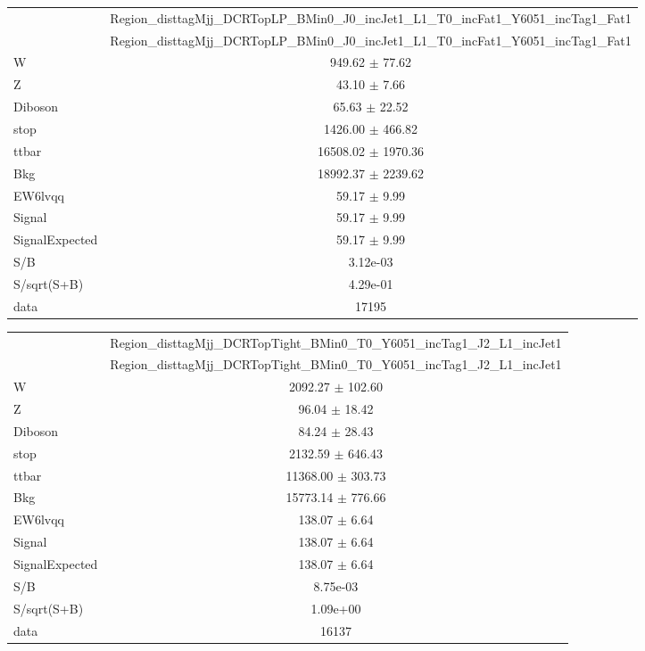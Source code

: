 \documentclass{article}
\begin{document}
\begin{table}
\centering
\small
\begin{tabular}{l|c|}
\cline{2-2}
 & \multicolumn{1}{c|}{Region\_disttagMjj\_DCRTopLP\_BMin0\_J0\_incJet1\_L1\_T0\_incFat1\_Y6051\_incTag1\_Fat1}\\
\cline{2-2}
 & \multicolumn{1}{c|}{Region\_disttagMjj\_DCRTopLP\_BMin0\_J0\_incJet1\_L1\_T0\_incFat1\_Y6051\_incTag1\_Fat1}\\ \hline
W & 949.62 $\pm$ 77.62\\
Z & 43.10 $\pm$ 7.66\\
Diboson & 65.63 $\pm$ 22.52\\
stop & 1426.00 $\pm$ 466.82\\
ttbar & 16508.02 $\pm$ 1970.36\\
\hline
Bkg & 18992.37 $\pm$ 2239.62\\
\hline
EW6lvqq & 59.17 $\pm$ 9.99\\
\hline
Signal & 59.17 $\pm$ 9.99\\
SignalExpected & 59.17 $\pm$ 9.99\\
\hline
S/B & 3.12e-03\\
S/sqrt(S+B) & 4.29e-01\\
\hline
data & 17195\\ \hline
\end{tabular}
\end{table}


\clearpage


\begin{table}
\centering
\small
\begin{tabular}{l|c|}
\cline{2-2}
 & \multicolumn{1}{c|}{Region\_disttagMjj\_DCRTopTight\_BMin0\_T0\_Y6051\_incTag1\_J2\_L1\_incJet1}\\
\cline{2-2}
 & \multicolumn{1}{c|}{Region\_disttagMjj\_DCRTopTight\_BMin0\_T0\_Y6051\_incTag1\_J2\_L1\_incJet1}\\ \hline
W & 2092.27 $\pm$ 102.60\\
Z & 96.04 $\pm$ 18.42\\
Diboson & 84.24 $\pm$ 28.43\\
stop & 2132.59 $\pm$ 646.43\\
ttbar & 11368.00 $\pm$ 303.73\\
\hline
Bkg & 15773.14 $\pm$ 776.66\\
\hline
EW6lvqq & 138.07 $\pm$ 6.64\\
\hline
Signal & 138.07 $\pm$ 6.64\\
SignalExpected & 138.07 $\pm$ 6.64\\
\hline
S/B & 8.75e-03\\
S/sqrt(S+B) & 1.09e+00\\
\hline
data & 16137\\ \hline
\end{tabular}
\end{table}
\end{document}
